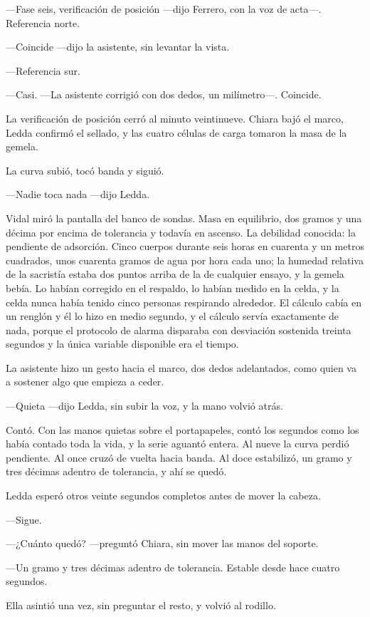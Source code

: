 ---Fase seis, verificación de posición ---dijo Ferrero, con la voz de acta---. Referencia norte.

---Coincide ---dijo la asistente, sin levantar la vista.

---Referencia sur.

---Casi. ---La asistente corrigió con dos dedos, un milímetro---. Coincide.

La verificación de posición cerró al minuto veintinueve. Chiara bajó el marco, Ledda confirmó el sellado, y las cuatro células de carga tomaron la masa de la gemela.

La curva subió, tocó banda y siguió.

---Nadie toca nada ---dijo Ledda.

Vidal miró la pantalla del banco de sondas. Masa en equilibrio, dos gramos y una décima por encima de tolerancia y todavía en ascenso. La debilidad conocida: la pendiente de adsorción. Cinco cuerpos durante seis horas en cuarenta y un metros cuadrados, unos cuarenta gramos de agua por hora cada uno; la humedad relativa de la sacristía estaba dos puntos arriba de la de cualquier ensayo, y la gemela bebía. Lo habían corregido en el respaldo, lo habían medido en la celda, y la celda nunca había tenido cinco personas respirando alrededor. El cálculo cabía en un renglón y él lo hizo en medio segundo, y el cálculo servía exactamente de nada, porque el protocolo de alarma disparaba con desviación sostenida treinta segundos y la única variable disponible era el tiempo.

La asistente hizo un gesto hacia el marco, dos dedos adelantados, como quien va a sostener algo que empieza a ceder.

---Quieta ---dijo Ledda, sin subir la voz, y la mano volvió atrás.

Contó. Con las manos quietas sobre el portapapeles, contó los segundos como los había contado toda la vida, y la serie aguantó entera. Al nueve la curva perdió pendiente. Al once cruzó de vuelta hacia banda. Al doce estabilizó, un gramo y tres décimas adentro de tolerancia, y ahí se quedó.

Ledda esperó otros veinte segundos completos antes de mover la cabeza.

---Sigue.

---¿Cuánto quedó? ---preguntó Chiara, sin mover las manos del soporte.

---Un gramo y tres décimas adentro de tolerancia. Estable desde hace cuatro segundos.

Ella asintió una vez, sin preguntar el resto, y volvió al rodillo.

